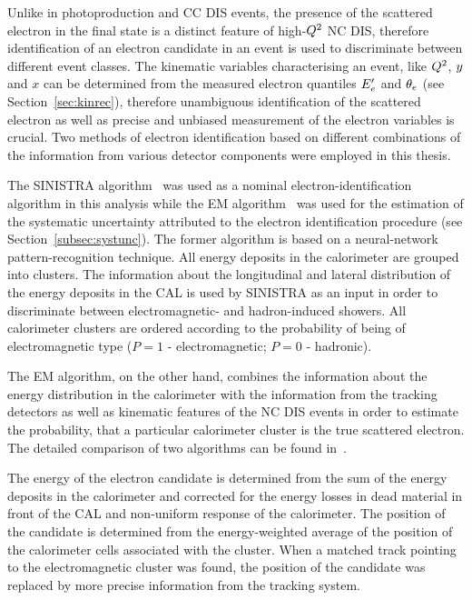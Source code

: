 Unlike in photoproduction and CC DIS events, the presence of the scattered electron in the final state is a distinct feature of high-$\mbox{${Q^2}$}$ NC DIS, therefore identification of an electron candidate in an event is used to discriminate between different event classes. The kinematic variables characterising an event, like $\mbox{${Q^2}$}$, $\mbox{${y}$}$ and $x$ can be determined from the measured electron quantiles $\mbox{$E_e'$}$ and $\mbox{$\theta_e$}$ (see Section~\ref{sec:kinrec}), therefore unambiguous identification of the scattered electron as well as precise and unbiased measurement of the electron variables is crucial. Two methods of electron identification based on different combinations of the information from various detector components were employed in this thesis. 

The SINISTRA algorithm~\cite{nim:a365:508} was used as a nominal electron-identification algorithm in this analysis while the EM algorithm~\cite{epj:c11:427,upub:Straub:url} was used for the estimation of the systematic uncertainty attributed to the electron identification procedure (see Section~\ref{subsec:systunc}). The former algorithm is based on a neural-network pattern-recognition technique. All energy deposits in the calorimeter are grouped into clusters. The information about the longitudinal and lateral distribution of the energy deposits in the CAL is used by SINISTRA as an input in order to discriminate between electromagnetic- and hadron-induced showers. All calorimeter clusters are ordered according to the probability of being of electromagnetic type ($P=1$ - electromagnetic; $P=0$ - hadronic). 

The EM algorithm, on the other hand, combines the information about the energy distribution in the calorimeter with the information from the tracking detectors as well as kinematic features of the NC DIS events in order to estimate the probability, that a particular calorimeter cluster is the true scattered electron. The detailed comparison of two algorithms can be found in~\cite{upub:schlenstedt:zn9977}.

The energy of the electron candidate is determined from the sum of the energy deposits in the calorimeter and corrected for the energy losses in dead material in front of the CAL and non-uniform response of the calorimeter. The position of the candidate is determined from the energy-weighted average of the position of the calorimeter cells associated with the cluster. When a matched track pointing to the electromagnetic cluster was found, the position of the candidate was replaced by more precise information from the tracking system.
